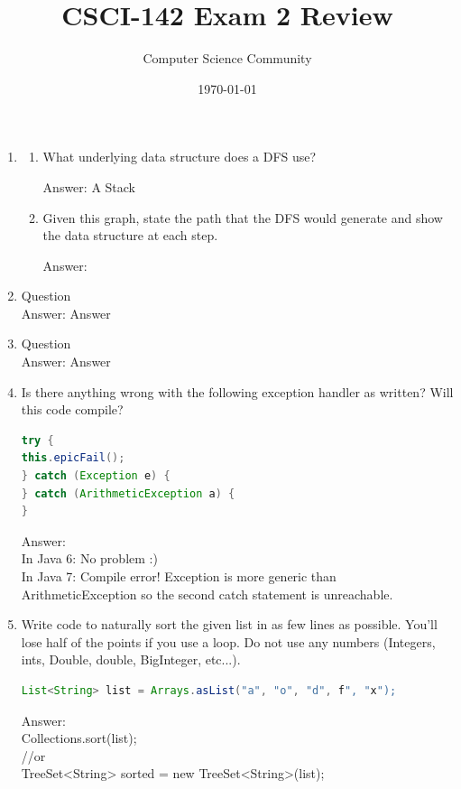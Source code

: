\documentclass[11pt]{article}
\title{CSCI-142 Exam 2 Review}
\author{Computer Science Community}
\date{\today}
\newenvironment{answer}{\large\lstset{basicstyle=\large\ttfamily}\color{white} \small{Answer:}}{}
\newenvironment{answer}{\large\lstset{basicstyle=\large\ttfamily}\color{red} \small{Answer:}}{}
\begin{document}
\header
\begin{enumerate}


\item  %
\begin{enumerate}
\item What underlying data structure does a DFS use? %

\begin{answer}
A Stack
\end{answer}

\item %
Given this graph, state the path that the DFS would generate and show the data structure at each step.

\begin{answer}

\end{answer}
\end{enumerate}

\item Question \\
\begin{answer}
Answer
\end{answer}


\item Question \\
\begin{answer}
Answer
\end{answer}



\item Is there anything wrong with the following exception handler as written? Will this
code compile? 
\begin{lstlisting}[language=java]
try {
this.epicFail();
} catch (Exception e) {
} catch (ArithmeticException a) {
}
\end{lstlisting}
\begin{answer}
\\ In Java 6: No problem :)
\\ In Java 7: Compile error!  Exception is more generic than ArithmeticException so the second catch statement is unreachable.
\end{answer}



\item Write code to naturally sort the given list in as few lines as possible. You'll lose half
of the points if you use a loop. Do not use any numbers (Integers, ints, Double, double,
BigInteger, etc...).
\begin{lstlisting}[language=java]
List<String> list = Arrays.asList("a", "o", "d", f", "x");
\end{lstlisting}
\begin{answer}
\\Collections.sort(list);
\\//or
\\TreeSet<String> sorted = new TreeSet<String>(list);
\end{answer}




\end{enumerate}
\end{document}
